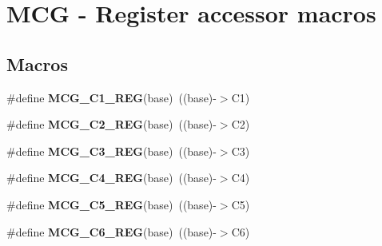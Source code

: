\hypertarget{group__MCG__Register__Accessor__Macros}{}\section{M\+CG -\/ Register accessor macros}
\label{group__MCG__Register__Accessor__Macros}
\subsection*{Macros}
\begin{DoxyCompactItemize}
\item 
\#define {\bfseries M\+C\+G\+\_\+\+C1\+\_\+\+R\+EG}(base)~((base)-\/$>$C1)\hypertarget{group__MCG__Register__Accessor__Macros_ga8bae88afeec8abab181383a6e5a9fecb}{}\label{group__MCG__Register__Accessor__Macros_ga8bae88afeec8abab181383a6e5a9fecb}

\item 
\#define {\bfseries M\+C\+G\+\_\+\+C2\+\_\+\+R\+EG}(base)~((base)-\/$>$C2)\hypertarget{group__MCG__Register__Accessor__Macros_ga1fe49262912ac579f147ae5c2cfde5a5}{}\label{group__MCG__Register__Accessor__Macros_ga1fe49262912ac579f147ae5c2cfde5a5}

\item 
\#define {\bfseries M\+C\+G\+\_\+\+C3\+\_\+\+R\+EG}(base)~((base)-\/$>$C3)\hypertarget{group__MCG__Register__Accessor__Macros_ga7ead9604d56b0f9d04a297a8ddad2bfd}{}\label{group__MCG__Register__Accessor__Macros_ga7ead9604d56b0f9d04a297a8ddad2bfd}

\item 
\#define {\bfseries M\+C\+G\+\_\+\+C4\+\_\+\+R\+EG}(base)~((base)-\/$>$C4)\hypertarget{group__MCG__Register__Accessor__Macros_ga7ecd15c7ea67a8febfe9fb84044905c8}{}\label{group__MCG__Register__Accessor__Macros_ga7ecd15c7ea67a8febfe9fb84044905c8}

\item 
\#define {\bfseries M\+C\+G\+\_\+\+C5\+\_\+\+R\+EG}(base)~((base)-\/$>$C5)\hypertarget{group__MCG__Register__Accessor__Macros_ga8d61340716746b32bbf9dc08f45bd8f6}{}\label{group__MCG__Register__Accessor__Macros_ga8d61340716746b32bbf9dc08f45bd8f6}

\item 
\#define {\bfseries M\+C\+G\+\_\+\+C6\+\_\+\+R\+EG}(base)~((base)-\/$>$C6)\hypertarget{group__MCG__Register__Accessor__Macros_ga900a3edcbbfc2933afe2a26c6774fd69}{}\label{group__MCG__Register__Accessor__Macros_ga900a3edcbbfc2933afe2a26c6774fd69}


\end{DoxyCompactItemize}
